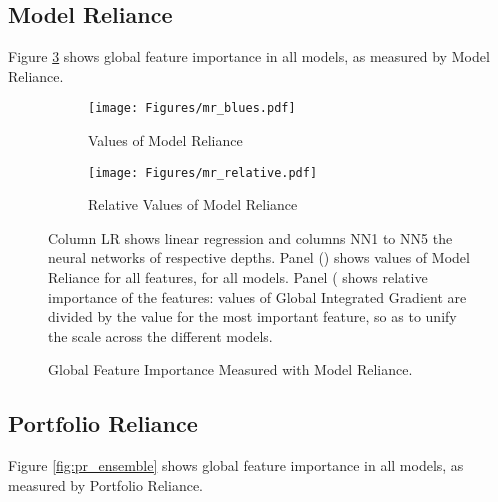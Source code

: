 		\subsection{Model Reliance}
	
			Figure \ref{fig:mr_ensemble} shows global feature importance in all models, as measured by Model Reliance.
			
			\begin{figure}	
				\centering		
				\begin{subfigure}[t]{\textwidth}
					\texttt{[image: Figures/mr\_blues.pdf]}
					\caption{Values of Model Reliance}
					\label{fig:mr_blues}
				\end{subfigure}
				
				\begin{subfigure}[t]{\textwidth}
					\centering
					\texttt{[image: Figures/mr\_relative.pdf]}
					\caption{Relative Values of Model Reliance}
					\label{fig:mr_relative}
				\end{subfigure}
				\caption{Global Feature Importance Measured with Model Reliance.}
				\medskip
				\small
				Column LR shows linear regression and columns NN1 to NN5 the neural networks of respective depths. Panel () shows values of Model Reliance for all features, for all models.  Panel ( shows relative importance of the features: values of Global Integrated Gradient are divided by the value for the most important feature, so as to unify the scale across the different models.
				\label{fig:mr_ensemble}
			\end{figure}
	
	\subsection{Portfolio Reliance}
	
		Figure \ref{fig:pr_ensemble} shows global feature importance in all models, as measured by Portfolio Reliance.
		
